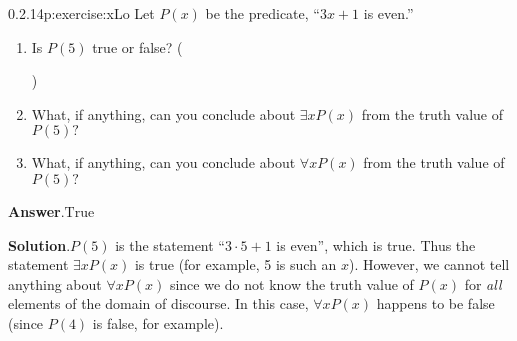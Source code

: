 \documentclass[twoside,11pt,]{book}
\newcommand{\blocktitlefont}{\relax}
\numberwithin{equation}{chapter}
\begin{document}
\begin{divisionsolution}{0.2.14}{}{p:exercise:xLo}%
Let \(P(x)\) be the predicate, ``\(3x+1\) is even.''%
\begin{enumerate}[label=(\alph*)]
\item{}Is \(P(5)\) true or false? \quad()\quad
%
\item{}What, if anything, can you conclude about \(\exists x P(x)\) from the truth value of \(P(5)\text{?}\)%
\item{}What, if anything, can you conclude about \(\forall x P(x)\) from the truth value of \(P(5)\text{?}\)%
\end{enumerate}
%
\par\smallskip%
\noindent\textbf{\blocktitlefont Answer}.\quad{}\(\text{True}\)%
\par\smallskip%
\noindent\textbf{\blocktitlefont Solution}.\quad{}\(P(5)\) is the statement ``\(3\cdot 5 + 1\) is even'', which is true. Thus the statement \(\exists x P(x)\) is true (for example, 5 is such an \(x\)). However, we cannot tell anything about \(\forall x P(x)\) since we do not know the truth value of \(P(x)\) for \emph{all} elements of the domain of discourse. In this case, \(\forall x P(x)\) happens to be false (since \(P(4)\) is false, for example).%
\end{divisionsolution}%
\end{document}
